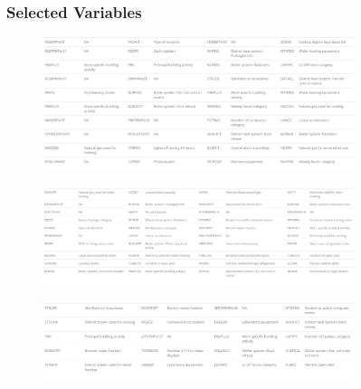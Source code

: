 \begin{figure}[ht]
\subsubsection{Selected Variables}
\label{appendix_nn:natural_gas:nn_full_variables}
\begin{subfigure}{1\textwidth}
\centering
\includegraphics[width=.99\textwidth, height=0.35\textheight]{Images/natural_gas_psf_nn_full_variables_1.png}
\end{subfigure}
\begin{subfigure}{1\textwidth}
\centering
\includegraphics[width=.99\textwidth, height=0.35\textheight]{Images/natural_gas_psf_nn_full_variables_2.png}
\end{subfigure}
\begin{subfigure}{1\textwidth}
\centering
\includegraphics[width=.99\textwidth, height=0.18\textheight]{Images/natural_gas_psf_nn_full_variables_3.png}
\end{subfigure}
\end{figure}